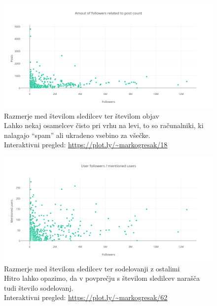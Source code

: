 \documentclass[a4paper,11pt]{article}
\begin{document}
\begin{figure}[htbp]
  \begin{center}
    \includegraphics[width=\textwidth,height=\textheight,keepaspectratio]{figures/follower-posts.png}
    \caption{Razmerje med številom sledilcev ter številom objav\\
    Lahko nekaj osamelcev čisto pri vrhu na levi, to so računalniki, ki nalagajo ``spam'' ali ukradeno vsebino za všečke. \\
    Interaktivni pregled: \href{https://plot.ly/~markogresak/18}{\underline{https://plot.ly/{\sim}markogresak/18}}}
  \end{center}
\end{figure}

\begin{figure}[htbp]
  \begin{center}
    \includegraphics[width=\textwidth,height=\textheight,keepaspectratio]{figures/follower-cooperations.png}
    \caption{Razmerje med številom sledilcev ter sodelovanji z ostalimi\\
    Hitro lahko opazimo, da v povprečju s številom sledilcev narašča tudi število sodelovanj. \\
    Interaktivni pregled: \href{https://plot.ly/~markogresak/62}{\underline{https://plot.ly/{\sim}markogresak/62}}}
  \end{center}
\end{figure}
\end{document}
